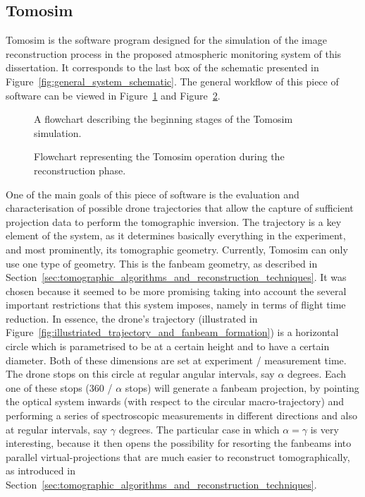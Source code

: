 \subsection{Tomosim}%
\label{sub:methods_tomosim}

Tomosim is the software program designed for the simulation of the image
reconstruction process in the proposed atmospheric monitoring system of
this dissertation. It corresponds to the last box of the schematic
presented in Figure~\ref{fig:general_system_schematic}. The general
workflow of this piece of software can be viewed in
Figure~\ref{fig:tomosim_start} and
Figure~\ref{fig:tomosim_reconstruction}.

\begin{figure}[htpb]
    \centering
    \missingfigure{}
    \caption{A flowchart describing the beginning stages of the Tomosim
    simulation.}%
    \label{fig:tomosim_start}
\end{figure}

\begin{figure}[htpb]
    \centering
    \missingfigure{}
    \caption{Flowchart representing the Tomosim operation during the
    reconstruction phase.}%
    \label{fig:tomosim_reconstruction}
\end{figure}


One of the main goals of this piece of software is the evaluation and
characterisation of possible drone trajectories that allow the capture
of sufficient projection data to perform the tomographic inversion. The
trajectory is a key element of the system, as it determines basically
everything in the experiment, and most prominently, its tomographic
geometry. Currently, Tomosim can only use one type of geometry. This is
the fanbeam geometry, as described in
Section~\ref{sec:tomographic_algorithms_and_reconstruction_techniques}.
It was chosen because it seemed to be more promising taking into account
the several important restrictions that this system imposes, namely in
terms of flight time reduction. In essence, the drone's trajectory
(illustrated in
Figure~\ref{fig:illustriated_trajectory_and_fanbeam_formation}) is a
horizontal circle which is parametrised to be at a certain height and to
have a certain diameter.  Both of these dimensions are set at experiment
/ measurement time. The drone stops on this circle at regular angular
intervals, say $\alpha$ degrees. Each one of these stops (360 / $\alpha$
stops) will generate a fanbeam projection, by pointing the optical
system inwards (with respect to the circular macro-trajectory) and
performing a series of spectroscopic measurements in different
directions and also at regular intervals, say $\gamma$ degrees. The
particular case in which $\alpha = \gamma$ is very interesting, because
it then opens the possibility for resorting the fanbeams into parallel
virtual-projections that are much easier to reconstruct tomographically,
as introduced in
Section~\ref{sec:tomographic_algorithms_and_reconstruction_techniques}.  

